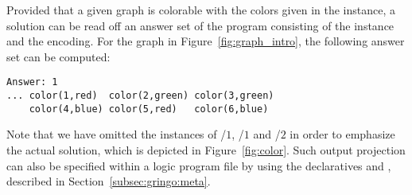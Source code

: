 Provided that a given graph is colorable with the colors given in the instance,
a solution can be read off an answer set of the program consisting
of the instance and the encoding.
For the graph in Figure~\ref{fig:graph_intro},
the following answer set can be computed:%
%
\begin{lstlisting}[numbers=none]
Answer: 1
... color(1,red)  color(2,green) color(3,green)
    color(4,blue) color(5,red)   color(6,blue)
\end{lstlisting}
%
Note that we have omitted the instances of /$1$, /$1$ 
and /$2$ in order to emphasize the actual solution,
which is depicted in Figure~\ref{fig:color}.
Such output projection can also be specified within a logic program file by
using the declaratives  and ,
described in Section~\ref{subsec:gringo:meta}.
